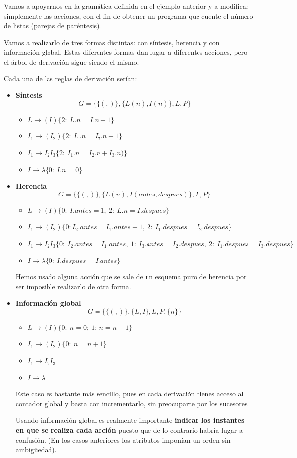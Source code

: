 \documentclass{apuntes}
\begin{document}
\begin{example}
Vamos a apoyarnos en la gramática definida en el ejemplo anterior y a modificar simplemente las acciones, con el fin de obtener un programa que cuente el número de listas (parejas de paréntesis).

Vamos a realizarlo de tres formas distintas: con síntesis, herencia y con información global. Estas diferentes formas dan lugar a diferentes acciones, pero el árbol de derivación sigue siendo el mismo.

Cada una de las reglas de derivación serían:

\begin{itemize}
\item \textbf{Síntesis}
\[G=\{\{(,)\}, \{L(n),I(n)\}, L, P\}\]
\begin{itemize}
\item $L \rightarrow (I) \{2: \ L.n = I.n+1\}$
\item $I_1 \rightarrow (I_2) \{2: \ I_1.n=I_2.n+1\}$
\item $I_1 \rightarrow I_2I_3 \{2: \ I_1.n = I_2.n + I_3.n)\}$
\item $I \rightarrow λ \{0: \ I.n=0\}$
\end{itemize}

\item \textbf{Herencia}
\[G=\{\{(,)\}, \{L(n),I(antes, despues)\}, L, P\}\]
\begin{itemize}
\item $L \rightarrow (I) \{0: \ I.antes=1, \ 2: \ L.n=I.despues\}$
\item $I_1 \rightarrow (I_2) \{0: I_2.antes = I_1.antes+1, \ 2: \ I_1.despues=I_2.despues\}$
\item $I_1 \rightarrow I_2I_3 \{0: \ I_2.antes = I_1.antes, \ 1: \ I_3.antes=I_2.despues, \ 2: \ I_1.despues=I_3.despues\}$
\item $I \rightarrow λ \{0: \ I.despues=I.antes\}$
\end{itemize}
Hemos usado alguna acción que se sale de un esquema puro de herencia por ser imposible realizarlo de otra forma.

\item \textbf{Información global}
\[G=\{\{(,)\}, \{L,I\}, L, P, \{n\}\}\]
\begin{itemize}
\item $L \rightarrow (I) \{0: \ n=0; \ 1: \ n = n+1\}$
\item $I_1 \rightarrow (I_2) \{0: \ n=n+1\}$
\item $I_1 \rightarrow I_2I_3$
\item $I \rightarrow λ $
\end{itemize}
Este caso es bastante más sencillo, pues en cada derivación tienes acceso al contador global y basta con incrementarlo, sin preocuparte por los sucesores.

Usando información global es realmente importante \textbf{indicar los instantes en que se realiza cada acción} puesto que de lo contrario habría lugar a confusión. (En los casos anteriores los atributos imponían un orden sin ambigüedad).

\end{itemize}
\end{example}
\end{document}
